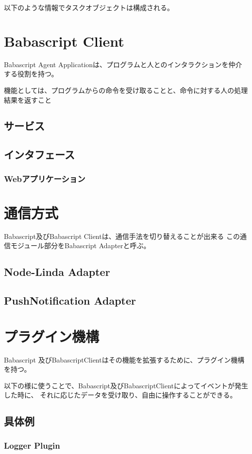 以下のような情報でタスクオブジェクトは構成される。

\section{Babascript Client}

Babascript Agent Applicationは、プログラムと人とのインタラクションを仲介する役割を持つ。

機能としては、プログラムからの命令を受け取ることと、命令に対する人の処理結果を返すこと

\subsection{サービス}

\subsection{インタフェース}

\subsubsection{Webアプリケーション}

\section{通信方式}

Babascript及びBabascript Clientは、通信手法を切り替えることが出来る
この通信モジュール部分をBabascript Adapterと呼ぶ。

\subsection{Node-Linda Adapter}

\subsection{PushNotification Adapter}

\section{プラグイン機構}

Babascript 及びBabascriptClientはその機能を拡張するために、プラグイン機構を持つ。

以下の様に使うことで、Babascript及びBabascriptClientによってイベントが発生した時に、
それに応じたデータを受け取り、自由に操作することができる。

\subsection{具体例}

\subsubsection{Logger Plugin}
